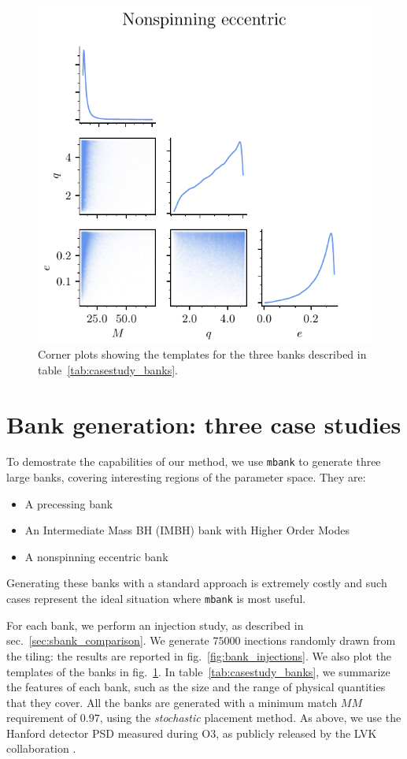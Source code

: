 \documentclass[twocolumn,showpacs,preprintnumbers,nofootinbib,prd,
superscriptaddress,10pt]{revtex4-2}
\begin{document}
\begin{figure}[t]
	\includegraphics[scale = 0.7]{bank_scatter_Nonspinning_eccentric}
	\caption{Corner plots showing the templates for the three banks described in table~\ref{tab:casestudy_banks}. }
	\label{fig:bank_scatter}
\end{figure}

\section{Bank generation: three case studies} \label{sec:bank_generation}

To demostrate the capabilities of our method, we use \texttt{mbank} to generate three large banks, covering interesting regions of the parameter space.
They are:
	\begin{itemize}
		\item A precessing bank
		\item An Intermediate Mass BH (IMBH) bank with Higher Order Modes
		\item A nonspinning eccentric bank
	\end{itemize}
Generating these banks with a standard approach is extremely costly and such cases represent the ideal situation where \texttt{mbank} is most useful.

For each bank, we perform an injection study, as described in sec.~\ref{sec:sbank_comparison}. We generate $75000$ inections randomly drawn from the tiling: the results are reported in fig.~\ref{fig:bank_injections}. We also plot the templates of the banks in fig.~\ref{fig:bank_scatter}.
In table~\ref{tab:casestudy_banks}, we summarize the features of each bank, such as the size and the range of physical quantities that they cover.
All the banks are generated with a minimum match $MM$ requirement of $0.97$, using the {\it stochastic} placement method.
As above, we use the Hanford detector PSD measured during O3, as publicly released by the LVK collaboration \cite{O3a_PSDs}.
\end{document}
